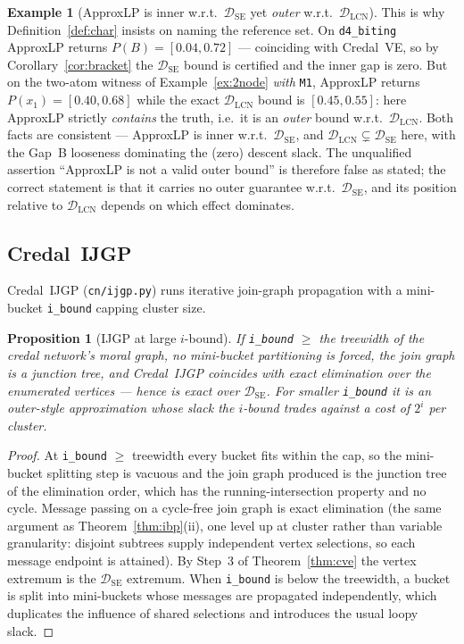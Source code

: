 \documentclass[11pt]{article}
\newtheorem{proposition}{Proposition}
\theoremstyle{definition}
\newtheorem{example}{Example}
\newcommand{\DSE}{\mathcal{D}_{\mathrm{SE}}}
\newcommand{\DLCN}{\mathcal{D}_{\mathrm{LCN}}}
\begin{document}
\begin{example}[ApproxLP is inner w.r.t.\ $\DSE$ yet \emph{outer} w.r.t.\ $\DLCN$]\label{ex:alpouter}
This is why Definition~\ref{def:char} insists on naming the reference set. On \texttt{d4\_biting}
ApproxLP returns $P(B)=[0.04,0.72]$ --- coinciding with Credal~VE, so by
Corollary~\ref{cor:bracket} the $\DSE$ bound is certified and the inner gap is zero. But on the
two-atom witness of Example~\ref{ex:2node} \emph{with} \texttt{M1}, ApproxLP returns
$P(x_1)=[0.40,0.68]$ while the exact $\DLCN$ bound is $[0.45,0.55]$: here ApproxLP strictly
\emph{contains} the truth, i.e.\ it is an \emph{outer} bound w.r.t.\ $\DLCN$. Both facts are
consistent --- ApproxLP is inner w.r.t.\ $\DSE$, and $\DLCN\subsetneq\DSE$ here, with the Gap~B
looseness dominating the (zero) descent slack. The unqualified assertion ``ApproxLP is not a valid
outer bound'' is therefore false as stated; the correct statement is that it carries no outer
guarantee w.r.t.\ $\DSE$, and its position relative to $\DLCN$ depends on which effect dominates.
\end{example}

\subsection{Credal~IJGP}\label{sec:ijgp}
Credal~IJGP (\texttt{cn/ijgp.py}) runs iterative join-graph propagation with a mini-bucket
\texttt{i\_bound} capping cluster size.

\begin{proposition}[IJGP at large $i$-bound]\label{prop:ijgp}
If \texttt{i\_bound} $\ge$ the treewidth of the credal network's moral graph, no mini-bucket
partitioning is forced, the join graph is a junction tree, and Credal~IJGP coincides with exact
elimination over the enumerated vertices --- hence is exact over $\DSE$. For smaller
\texttt{i\_bound} it is an outer-style approximation whose slack the $i$-bound trades against a cost
of $2^{i}$ per cluster.
\end{proposition}

\begin{proof}
At \texttt{i\_bound} $\ge$ treewidth every bucket fits within the cap, so the mini-bucket splitting
step is vacuous and the join graph produced is the junction tree of the elimination order, which has
the running-intersection property and no cycle. Message passing on a cycle-free join graph is exact
elimination (the same argument as Theorem~\ref{thm:ibp}(ii), one level up at cluster rather than
variable granularity: disjoint subtrees supply independent vertex selections, so each message endpoint
is attained). By Step~3 of Theorem~\ref{thm:cve} the vertex extremum is the $\DSE$ extremum. When
\texttt{i\_bound} is below the treewidth, a bucket is split into mini-buckets whose messages are
propagated independently, which duplicates the influence of shared selections and introduces the
usual loopy slack.
\end{proof}
\end{document}
